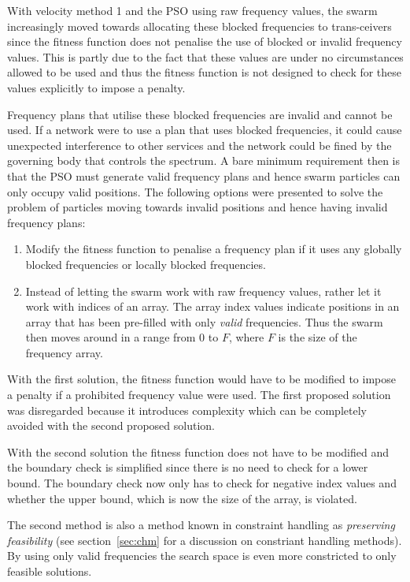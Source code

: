 With velocity method 1 and the PSO using raw frequency values, the swarm increasingly moved towards allocating these blocked frequencies to trans-ceivers since the fitness function does not penalise the use of blocked or invalid frequency values. This is partly due to the fact that these values are under no circumstances allowed to be used and thus the fitness function is not designed to check for these values explicitly to impose a penalty.

Frequency plans that utilise these blocked frequencies are invalid and cannot be used. If a network were to use a plan that uses blocked frequencies, it could cause unexpected interference to other services and the network could be fined by the governing body that controls the spectrum. A bare minimum requirement then is that the PSO must generate valid frequency plans and hence swarm particles can only occupy valid positions. The following options were presented to solve the problem of particles moving towards invalid positions and hence having invalid frequency plans:
\begin{enumerate}
\item Modify the fitness function to penalise a frequency plan if it uses any globally blocked frequencies or locally blocked frequencies.
\item Instead of letting the swarm work with raw frequency values, rather let it work with indices of an array. The array index values indicate positions in an array that has been pre-filled with only \emph{valid} frequencies. Thus the swarm then moves around in a range from 0 to $F$, where $F$ is the size of the frequency array.
\end{enumerate}

With the first solution, the fitness function would have to be modified to impose a penalty if a prohibited frequency value were used. The first proposed solution was disregarded because it introduces complexity which can be completely avoided with the second proposed solution.

With the second solution the fitness function does not have to be modified and the boundary check is simplified since there is no need to check for a lower bound. The boundary check now only has to check for negative index values and whether the upper bound, which is now the size of the array, is violated. 

The second method is also a method known in constraint handling as \emph{preserving feasibility} (see section~\ref{sec:chm} for a discussion on constriant handling methods). By using only valid frequencies the search space is even more constricted to only feasible solutions.


